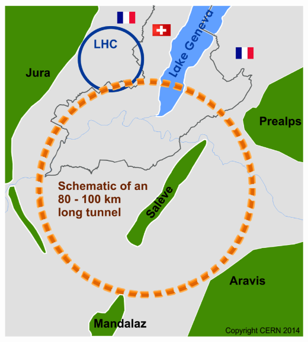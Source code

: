 \documentclass[aspectratio=169, hyperref={colorlinks=true,pdfpagelabels=false,linkcolor=black}, xcolor=dvipsnames,10pt]{beamer}
\begin{document}
\begin{frame}
\begin{columns}
	\centering
	\includegraphics[width=\textwidth]{../figures/cernFCC}
	\end{columns}
	

\end{frame}
\end{document}
